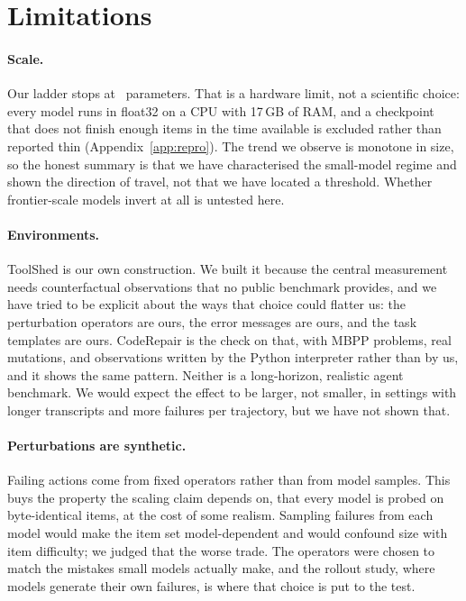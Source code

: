\section{Limitations}
\label{sec:limitations}

\paragraph{Scale.}
Our ladder stops at \LargestModel\ parameters. That is a hardware limit, not a
scientific choice: every model runs in float32 on a CPU with 17\,GB of RAM, and
a checkpoint that does not finish enough items in the time available is
excluded rather than reported thin (Appendix~\ref{app:repro}). The trend we
observe is monotone in size, so the honest summary is that we have characterised
the small-model regime and shown the direction of travel, not that we have
located a threshold. Whether frontier-scale models invert at all is untested
here.

\paragraph{Environments.}
ToolShed is our own construction. We built it because the central measurement
needs counterfactual observations that no public benchmark provides, and we have
tried to be explicit about the ways that choice could flatter us: the
perturbation operators are ours, the error messages are ours, and the task
templates are ours. CodeRepair is the check on that, with MBPP problems, real mutations, and
observations written by the Python interpreter rather than by us, and it shows
the same pattern. Neither is a long-horizon, realistic agent
benchmark. We would expect the effect to be larger, not smaller, in settings
with longer transcripts and more failures per trajectory, but we have not shown
that.

\paragraph{Perturbations are synthetic.}
Failing actions come from fixed operators rather than from model samples. This buys the property the scaling claim depends on, that every model is
probed on byte-identical items, at the cost of some realism. Sampling failures from each
model would make the item set model-dependent and would confound size with item
difficulty; we judged that the worse trade. The operators were chosen to match
the mistakes small models actually make, and the rollout study, where models
generate their own failures, is where that choice is put to the test.

